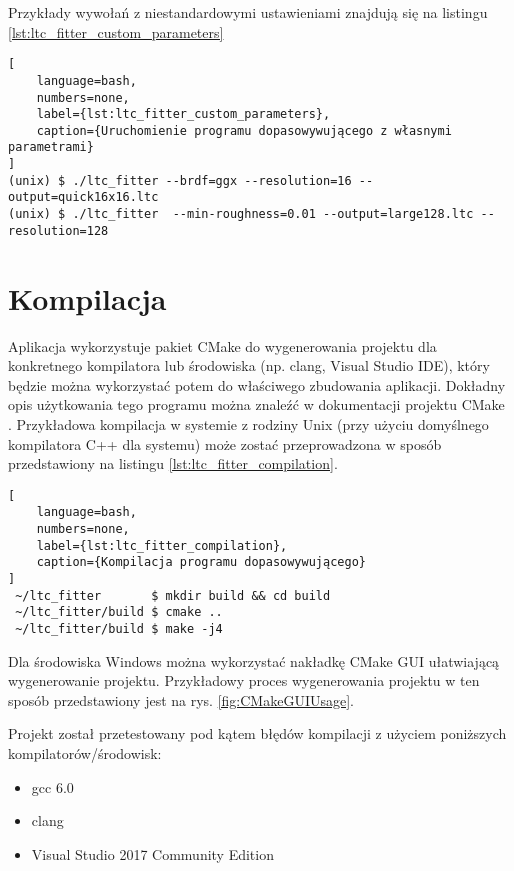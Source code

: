\documentclass[../main.tex]{subfiles}
\begin{document}
Przykłady wywołań z niestandardowymi ustawieniami znajdują się na listingu \ref{lst:ltc_fitter_custom_parameters}

\begin{lstlisting}[
    language=bash,
    numbers=none,
    label={lst:ltc_fitter_custom_parameters},
    caption={Uruchomienie programu dopasowywującego z własnymi parametrami}
]
(unix) $ ./ltc_fitter --brdf=ggx --resolution=16 --output=quick16x16.ltc
(unix) $ ./ltc_fitter  --min-roughness=0.01 --output=large128.ltc --resolution=128
\end{lstlisting}

\section{Kompilacja}
\label{section:ltcFitterCompilation}

Aplikacja wykorzystuje pakiet CMake do wygenerowania projektu dla konkretnego kompilatora lub środowiska (np. clang, Visual Studio IDE), który będzie można wykorzystać potem do właściwego zbudowania aplikacji. Dokładny opis użytkowania tego programu można znaleźć w dokumentacji projektu CMake \cite{CMakeDoc}. Przykładowa kompilacja w systemie z rodziny Unix (przy użyciu domyślnego kompilatora C++ dla systemu) może zostać przeprowadzona w sposób przedstawiony na listingu \ref{lst:ltc_fitter_compilation}.

\begin{lstlisting}[
    language=bash,
    numbers=none,
    label={lst:ltc_fitter_compilation},
    caption={Kompilacja programu dopasowywującego}
]
 ~/ltc_fitter       $ mkdir build && cd build
 ~/ltc_fitter/build $ cmake ..
 ~/ltc_fitter/build $ make -j4
\end{lstlisting}

Dla środowiska Windows można wykorzystać nakładkę CMake GUI ułatwiającą wygenerowanie projektu. Przykładowy proces wygenerowania projektu w ten sposób przedstawiony jest na rys. \ref{fig:CMakeGUIUsage}.

Projekt został przetestowany pod kątem błędów kompilacji z użyciem poniższych kompilatorów/środowisk:
\begin{itemize}
    \item gcc 6.0
    \item clang
    \item Visual Studio 2017 Community Edition
\end{itemize}
\end{document}
